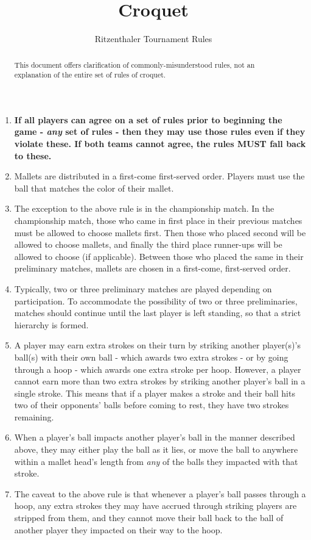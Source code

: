\documentclass[a4paper]{article}
\title{Croquet}
\author{Ritzenthaler Tournament Rules}
\begin{document}
\maketitle
\begin{abstract}
This document offers clarification of commonly-misunderstood rules, not an explanation of the entire set of rules of croquet.
\end{abstract}

\begin{enumerate}
\item \textbf{If all players can agree on a set of rules prior to beginning the game - \textit{any} set of rules - then they may use those rules even if they violate these. If both teams cannot agree, the rules MUST fall back to these.}
\item Mallets are distributed in a first-come first-served order. Players must use the ball that matches the color of their mallet.
\item The exception to the above rule is in the championship match. In the championship match, those who came in first place in their previous matches must be allowed to choose mallets first. Then those who placed second will be allowed to choose mallets, and finally the third place runner-ups will be allowed to choose (if applicable). Between those who placed the same in their preliminary matches, mallets are chosen in a first-come, first-served order.
\item Typically, two or three preliminary matches are played depending on participation. To accommodate the possibility of two or three preliminaries, matches should continue until the last player is left standing, so that a strict hierarchy is formed.
\item A player may earn extra strokes on their turn by striking another player(s)'s ball(s) with their own ball - which awards two extra strokes - or by going through a hoop - which awards one extra stroke per hoop. However, a player cannot earn more than two extra strokes by striking another player's ball in a single stroke. This means that if a player makes a stroke and their ball hits two of their opponents' balls before coming to rest, they have two strokes remaining.
\item When a player's ball impacts another player's ball in the manner described above, they may either play the ball as it lies, or move the ball to anywhere within a mallet head's length from \textit{any} of the balls they impacted with that stroke.
\item The caveat to the above rule is that whenever a player's ball passes through a hoop, any extra strokes they may have accrued through striking players are stripped from them, and they cannot move their ball back to the ball of another player they impacted on their way to the hoop.

\end{enumerate}
\end{document}
